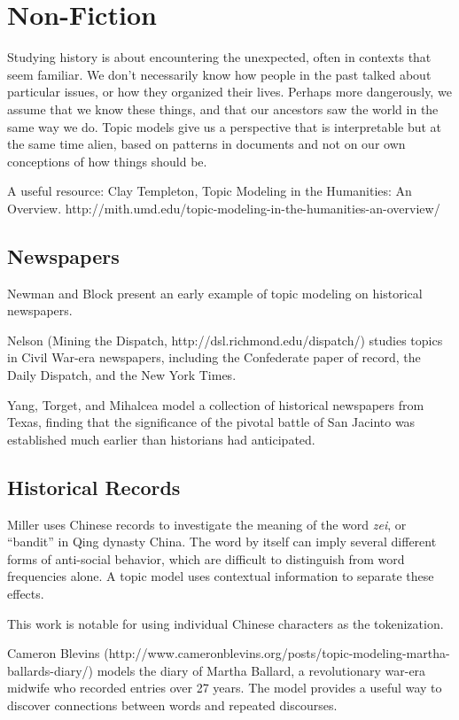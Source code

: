 
\chapter{Non-Fiction}
\label{ch:nonfiction}

Studying history is about encountering the unexpected, often in contexts that seem familiar. We don't necessarily know how people in the past talked about particular issues, or how they organized their lives. Perhaps more dangerously, we assume that we know these things, and that our ancestors saw the world in the same way we do. Topic models give us a perspective that is interpretable but at the same time alien, based on patterns in documents and not on our own conceptions of how things should be.

A useful resource:
Clay Templeton, Topic Modeling in the Humanities: An Overview. 
http://mith.umd.edu/topic-modeling-in-the-humanities-an-overview/

\section{Newspapers}

Newman and Block \cite{newman-06} present an early example of topic modeling on historical newspapers.

Nelson (Mining the Dispatch, http://dsl.richmond.edu/dispatch/) studies topics in Civil War-era newspapers, including the Confederate paper of record, the Daily Dispatch, and the New York Times.

Yang, Torget, and Mihalcea \cite{yang-11-historical} model a collection of historical newspapers from Texas, finding that the significance of the pivotal battle of San Jacinto was established much earlier than historians had anticipated.

\section{Historical Records}

Miller \cite{miller-13} uses Chinese records to investigate the meaning of the word {\em zei}, or ``bandit'' in Qing dynasty China. The word by itself can imply several different forms of anti-social behavior, which are difficult to distinguish from word frequencies alone. A topic model uses contextual information to separate these effects.

This work is notable for using individual Chinese characters as the tokenization.

Cameron Blevins (http://www.cameronblevins.org/posts/topic-modeling-martha-ballards-diary/) models the diary of Martha Ballard, a revolutionary war-era midwife who recorded entries over 27 years. The model provides a useful way to discover connections between words and repeated discourses.

